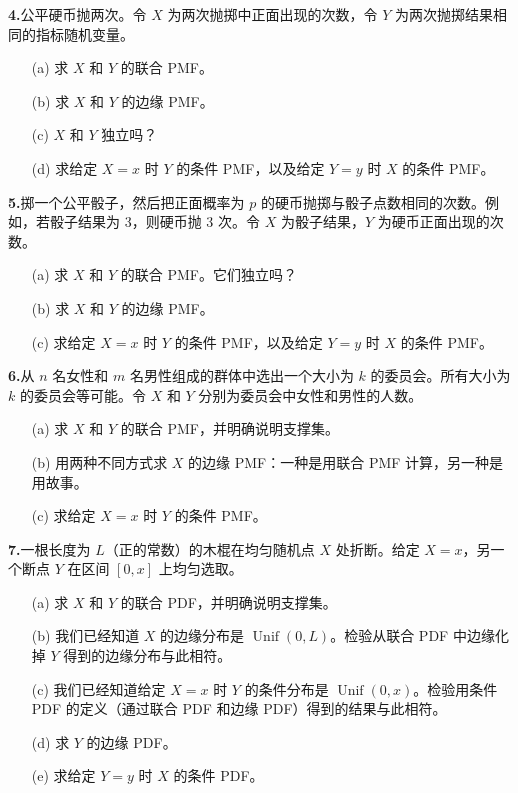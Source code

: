 \documentclass[UTF8,12pt,a4paper,fontset=fandol]{ctexart}
\begin{document}
\noindent\textbf{4.}\quad 公平硬币抛两次。令 $X$ 为两次抛掷中正面出现的次数，令 $Y$ 为两次抛掷结果相同的指标随机变量。
\begin{enumerate}
  \item[(a)] 求 $X$ 和 $Y$ 的联合 PMF。
  \item[(b)] 求 $X$ 和 $Y$ 的边缘 PMF。
  \item[(c)] $X$ 和 $Y$ 独立吗？
  \item[(d)] 求给定 $X=x$ 时 $Y$ 的条件 PMF，以及给定 $Y=y$ 时 $X$ 的条件 PMF。
\end{enumerate}

\noindent\textbf{5.}\quad 掷一个公平骰子，然后把正面概率为 $p$ 的硬币抛掷与骰子点数相同的次数。例如，若骰子结果为 3，则硬币抛 3 次。令 $X$ 为骰子结果，$Y$ 为硬币正面出现的次数。
\begin{enumerate}
  \item[(a)] 求 $X$ 和 $Y$ 的联合 PMF。它们独立吗？
  \item[(b)] 求 $X$ 和 $Y$ 的边缘 PMF。
  \item[(c)] 求给定 $X=x$ 时 $Y$ 的条件 PMF，以及给定 $Y=y$ 时 $X$ 的条件 PMF。
\end{enumerate}

\noindent\textbf{6.}\quad 从 $n$ 名女性和 $m$ 名男性组成的群体中选出一个大小为 $k$ 的委员会。所有大小为 $k$ 的委员会等可能。令 $X$ 和 $Y$ 分别为委员会中女性和男性的人数。
\begin{enumerate}
  \item[(a)] 求 $X$ 和 $Y$ 的联合 PMF，并明确说明支撑集。
  \item[(b)] 用两种不同方式求 $X$ 的边缘 PMF：一种是用联合 PMF 计算，另一种是用故事。
  \item[(c)] 求给定 $X=x$ 时 $Y$ 的条件 PMF。
\end{enumerate}

\noindent\textbf{7.}\quad 一根长度为 $L$（正的常数）的木棍在均匀随机点 $X$ 处折断。给定 $X=x$，另一个断点 $Y$ 在区间 $[0,x]$ 上均匀选取。
\begin{enumerate}
  \item[(a)] 求 $X$ 和 $Y$ 的联合 PDF，并明确说明支撑集。
  \item[(b)] 我们已经知道 $X$ 的边缘分布是 $\operatorname{Unif}(0,L)$。检验从联合 PDF 中边缘化掉 $Y$ 得到的边缘分布与此相符。
  \item[(c)] 我们已经知道给定 $X=x$ 时 $Y$ 的条件分布是 $\operatorname{Unif}(0,x)$。检验用条件 PDF 的定义（通过联合 PDF 和边缘 PDF）得到的结果与此相符。
  \item[(d)] 求 $Y$ 的边缘 PDF。
  \item[(e)] 求给定 $Y=y$ 时 $X$ 的条件 PDF。
\end{enumerate}
\end{document}
